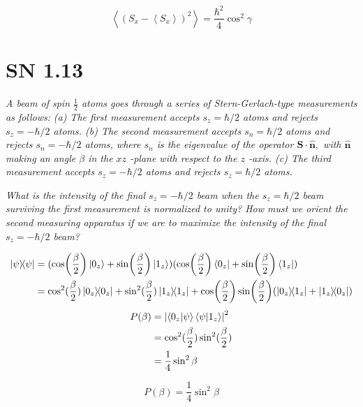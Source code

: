 \documentclass{article}
\begin{document}
\begin{equation*}
    \boxed{\left\langle\left(S_{x}-\left\langle S_{x}\right\rangle\right)^{2}\right\rangle = \frac{\hbar^2}{4} \cos^2 \gamma}
\end{equation*}

\newpage


\section{SN 1.13}
\textit{A beam of spin $\frac{1}{2}$ atoms goes through a series of Stern-Gerlach-type measurements as follows:}
\textit{\newline (a) The first measurement accepts $s_{z}=\hbar / 2$ atoms and rejects $s_{z}=-\hbar / 2$ atoms.
\newline(b) The second measurement accepts $s_{n}=\hbar / 2$ atoms and rejects $s_{n}=-\hbar / 2$ atoms, where $s_{n}$ is the eigenvalue of the operator $\mathbf{S} \cdot \hat{\mathbf{n}},$ with $\hat{\mathbf{n}}$ making an angle $\beta$ in the $x z$ -plane with respect to the $z$ -axis.
\newline(c) The third measurement accepts $s_{z}=-\hbar / 2$ atoms and rejects $s_{z}=\hbar / 2$ atoms.}

\textit{What is the intensity of the final $s_{z}=-\hbar / 2$ beam when the $s_{z}=\hbar / 2$ beam surviving the first measurement is normalized to unity? How must we orient the second measuring apparatus if we are to maximize the intensity of the final $s_{z}=-\hbar / 2$ beam?}

\begin{align*}
    \ketbra{\psi} &= (\cos (\frac{\beta }{2}) \ket{0_z} + \sin (\frac{\beta }{2}) \ket{1_z})(\cos (\frac{\beta }{2}) \bra{0_z} + \sin (\frac{\beta }{2}) \bra{1_z})\\
    &= \cos^2 (\frac{\beta }{2}) \ketbra{0_z} + \sin^2 (\frac{\beta }{2}) \ketbra{1_z}+\cos (\frac{\beta }{2})\sin (\frac{\beta }{2})( \ketbra{0_z}{1_z}+ \ketbra{1_z}{0_z}) \\
\end{align*}
\begin{align*}
P(\beta) &= \left| \braket{0_z}{\psi}\braket{\psi}{1_z}\right|^2 \\
&= \cos^2 (\frac{\beta }{2})\sin^2 (\frac{\beta }{2})\\ 
&= \frac{1}{4}\sin^2 \beta
\end{align*}

$$\boxed{P(\beta) = \frac{1}{4}\sin^2 \beta }$$
\end{document}
